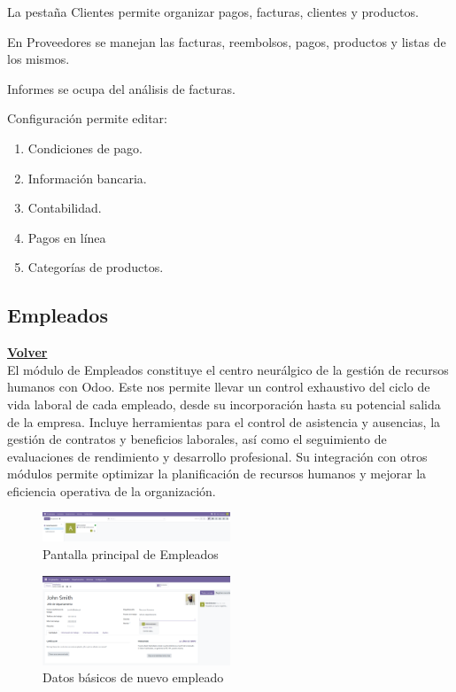 \documentclass[a4paper,12pt]{article}
\begin{document}
La pestaña Clientes permite organizar pagos, facturas, clientes y productos.

En Proveedores se manejan las facturas, reembolsos, pagos, productos y listas de los mismos.

Informes se ocupa del análisis de facturas.

Configuración permite editar:
\begin{enumerate}
    \item Condiciones de pago.
    \item Información bancaria.
    \item Contabilidad.
    \item Pagos en línea
    \item Categorías de productos.
\end{enumerate}


\subsection{Empleados}
\hyperlink{anchor-indice}{\textbf{Volver}}\\

El módulo de Empleados constituye el centro neurálgico de la gestión de recursos humanos con Odoo. Este nos permite llevar un control exhaustivo del ciclo de vida laboral de cada empleado, desde su incorporación hasta su potencial salida de la empresa.
Incluye herramientas para el control de asistencia y ausencias, la gestión de contratos y beneficios laborales, así como el seguimiento de evaluaciones de rendimiento y desarrollo profesional.
Su integración con otros módulos permite optimizar la planificación de recursos humanos y mejorar la eficiencia operativa de la organización.

\begin{figure}[h!]
    \centering
    \includegraphics[width=0.5\textwidth]{pr2odoo11-empleadosMain.png}
    \caption{Pantalla principal de Empleados}
\end{figure}
\FloatBarrier

\begin{figure}[h!]
    \centering
    \includegraphics[width=0.5\textwidth]{pr2odoo12-DatosBasicosDeNuevoEmpleado.png}
    \caption{Datos básicos de nuevo empleado}
\end{figure}
\FloatBarrier
\end{document}
